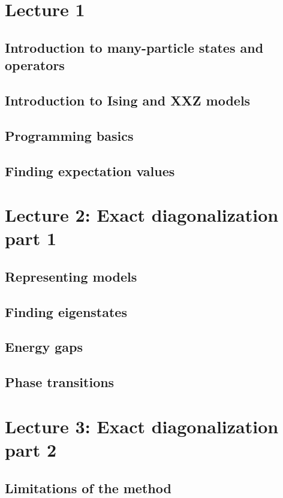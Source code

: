 \documentclass{book}
\theoremstyle{definition}
\begin{document}
\newpage

\section{Lecture 1}
\subsection{Introduction to many-particle states and operators}
\newpage
\subsection{Introduction to Ising and XXZ models}
\newpage
\subsection{Programming basics}
\newpage
\subsection{Finding expectation values}
\newpage

\section{Lecture 2: Exact diagonalization part 1}
\subsection{Representing models}
\newpage
\subsection{Finding eigenstates}
\newpage
\subsection{Energy gaps}
\newpage
\subsection{Phase transitions}
\newpage




\section{Lecture 3: Exact diagonalization part 2}
\subsection{Limitations of the method}
\newpage
\end{document}
